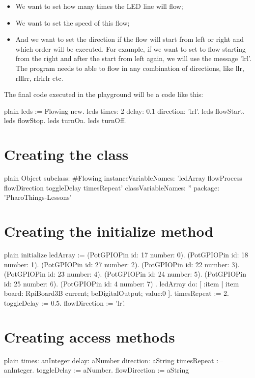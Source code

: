 \documentclass[10pt,twoside,english]{_support/latex/sbabook/sbabook}
\begin{document}
\begin{itemize}
\item We want to set how many times the LED line will flow;
\item We want to set the speed of this flow;
\item And we want to set the direction if the flow will start from left or right and which order will be executed. For example, if we want to set to flow starting from the right and after the start from left again, we will use the message 'lrl'. The program needs to able to flow in any combination of directions, like llr, rlllrr, rlrlrlr etc.
\end{itemize}

The final code executed in the playground will be a code like this: 

\begin{displaycode}{plain}
leds := Flowing new.
leds times: 2 delay: 0.1 direction: 'lrl'.
leds flowStart.
leds flowStop.
leds turnOn.
leds turnOff.
\end{displaycode}
\section{Creating the class}
\begin{displaycode}{plain}
Object subclass: #Flowing
    instanceVariableNames: 'ledArray flowProcess flowDirection toggleDelay timesRepeat'
    classVariableNames: ''
    package: 'PharoThings-Lessons'
\end{displaycode}
\section{Creating the initialize method}
\begin{displaycode}{plain}
initialize
    ledArray := { 
    (PotGPIOPin id: 17 number: 0).
    (PotGPIOPin id: 18 number: 1).
    (PotGPIOPin id: 27 number: 2).
    (PotGPIOPin id: 22 number: 3).
    (PotGPIOPin id: 23 number: 4).
    (PotGPIOPin id: 24 number: 5).
    (PotGPIOPin id: 25 number: 6).
    (PotGPIOPin id: 4 number: 7)
    }.
   ledArray do: [ :item | item board: RpiBoard3B current; beDigitalOutput; value:0 ].
    timesRepeat := 2.
    toggleDelay := 0.5.
    flowDirection := 'lr'.
\end{displaycode}
\section{Creating access methods}
\begin{displaycode}{plain}
times: anInteger delay: aNumber direction: aString
    timesRepeat := anInteger.
    toggleDelay := aNumber.
    flowDirection := aString
\end{displaycode}
\end{document}
